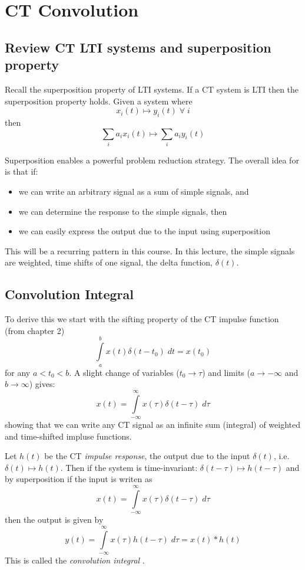 \chapter{CT Convolution}

\section{Review CT LTI systems and superposition property}

Recall the superposition property of LTI systems. If a CT system is LTI then the superposition property holds. Given a system where
\[   
x_i(t) \mapsto y_i(t) \; \forall\; i
\]
then
\[
\sum\limits_{i} a_i x_i(t) \mapsto \sum\limits_{i} a_i y_i(t) 
\]

Superposition enables a powerful problem reduction strategy. The overall idea for is that if:

\begin{itemize}
\item we can write an arbitrary signal as a sum of simple signals, and 
\item we can determine the response to the simple signals, then
\item we can easily express the output due to the input using superposition
\end{itemize}

This will be a recurring pattern in this course. In this lecture, the simple signals are weighted, time shifts of one signal, the delta function, $\delta(t)$.

\section{Convolution Integral}

To derive this we start with the sifting property of the CT impulse function (from chapter 2)
\[
\int\limits_{a}^{b} x(t)\delta(t-t_0) \; dt = x(t_0)
\]
for any $a < t_0 < b$. A slight change of variables ($t_0 \rightarrow \tau$) and limits ($a \rightarrow -\infty$ and $b \rightarrow \infty$) gives:
\[
x(t) = \int\limits_{-\infty}^{\infty} x(\tau)\delta(t-\tau) \; d\tau
\]
showing that we can write any CT signal as an infinite sum (integral) of weighted and time-shifted impluse functions.

Let $h(t)$ be the CT {\it impulse response}, the output due to the input $\delta(t)$, i.e. $\delta(t) \mapsto h(t)$. Then if the system is time-invariant: $\delta(t-\tau) \mapsto h(t-\tau)$ and by superposition if the input is writen as
\[
x(t) = \int\limits_{-\infty}^{\infty} x(\tau)\delta(t-\tau) \; d\tau
\]
then the output is given by
\[
  y(t) = \int\limits_{-\infty}^{\infty} x(\tau)h(t-\tau) \; d\tau = x(t) * h(t)
\]
This is called the \emph{convolution integral} .

